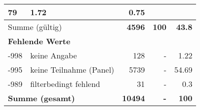 \begin{longtable}{lXrrr}
       \num{79} &
       \num[round-mode=places,round-precision=2]{1.72} &
         \num[round-mode=places,round-precision=2]{0.75} \\
     \midrule
     \multicolumn{2}{l}{Summe (gültig)} &
       \textbf{\num{4596}} &
     \textbf{\num{100}} &
       \textbf{\num[round-mode=places,round-precision=2]{43.8}} \\
     \multicolumn{5}{l}{\textbf{Fehlende Werte}}\\
       -998 &
       keine Angabe &
         \num{128} &
        - &
         \num[round-mode=places,round-precision=2]{1.22} \\
       -995 &
       keine Teilnahme (Panel) &
         \num{5739} &
        - &
         \num[round-mode=places,round-precision=2]{54.69} \\
       -989 &
       filterbedingt fehlend &
         \num{31} &
        - &
         \num[round-mode=places,round-precision=2]{0.3} \\
     \midrule
     \multicolumn{2}{l}{\textbf{Summe (gesamt)}} &
          \textbf{\num{10494}} &
        \textbf{-} &
        \textbf{\num{100}} \\
     \bottomrule
     \end{longtable}
     
